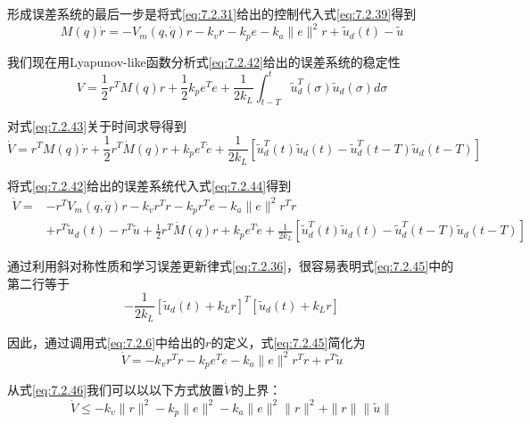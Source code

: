 \documentclass[UTF8]{ctexart}
\begin{document}
形成误差系统的最后一步是将式\eqref{eq:7.2.31}给出的控制代入式\eqref{eq:7.2.39}得到
\begin{equation}\label{eq:7.2.42}
M(q)\dot{r} = -V_m(q,\dot{q})r - k_v r - k_p e - k_a\|e\|^2r + \tilde{u}_d(t) - \tilde{u}
\end{equation}

我们现在用Lyapunov-like函数分析式\eqref{eq:7.2.42}给出的误差系统的稳定性
\begin{equation}\label{eq:7.2.43}
V = \frac{1}{2}r^T M(q)r + \frac{1}{2}k_p e^T e + \frac{1}{2k_L}\int_{t-T}^{t}\tilde{u}_d^T(\sigma)\tilde{u}_d(\sigma)d\sigma
\end{equation}

对式\eqref{eq:7.2.43}关于时间求导得到
\begin{equation}\label{eq:7.2.44}
\dot{V} = r^T M(q)\dot{r} + \frac{1}{2}r^T\dot{M}(q)r + k_p e^T\dot{e} + \frac{1}{2k_L}[\tilde{u}_d^T(t)\tilde{u}_d(t) - \tilde{u}_d^T(t-T)\tilde{u}_d(t-T)]
\end{equation}

将式\eqref{eq:7.2.42}给出的误差系统代入式\eqref{eq:7.2.44}得到
\begin{equation}\label{eq:7.2.45}
\begin{aligned}
\dot{V} = & -r^T V_m(q,\dot{q})r - k_v r^T r - k_p r^T e - k_a\|e\|^2r^T r \\
& + r^T\tilde{u}_d(t) - r^T\tilde{u} + \frac{1}{2}r^T\dot{M}(q)r + k_p e^T\dot{e} + \frac{1}{2k_L}[\tilde{u}_d^T(t)\tilde{u}_d(t) - \tilde{u}_d^T(t-T)\tilde{u}_d(t-T)]
\end{aligned}
\end{equation}

通过利用斜对称性质和学习误差更新律式\eqref{eq:7.2.36}，很容易表明式\eqref{eq:7.2.45}中的第二行等于
\begin{equation*}
-\frac{1}{2k_L}[\tilde{u}_d(t) + k_L r]^T[\tilde{u}_d(t) + k_L r]
\end{equation*}

因此，通过调用式\eqref{eq:7.2.6}中给出的$r$的定义，式\eqref{eq:7.2.45}简化为
\begin{equation}\label{eq:7.2.46}
\dot{V} = -k_v r^T r - k_p e^T e - k_a\|e\|^2r^T r + r^T\tilde{u}
\end{equation}

从式\eqref{eq:7.2.46}我们可以以以下方式放置$\dot{V}$的上界：
\begin{equation}\label{eq:7.2.47}
\dot{V} \leq -k_v \|r\|^2 - k_p \|e\|^2 - k_a\|e\|^2\|r\|^2 + \|r\|\|\tilde{u}\|
\end{equation}
\end{document}
